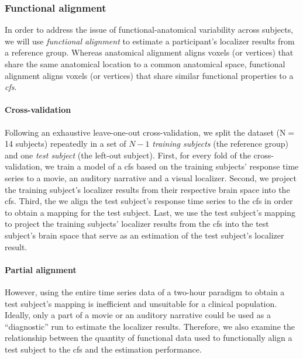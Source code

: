 \subsubsection{Functional alignment}


In order to address the issue of functional-anatomical variability across
subjects, we will use \textit{functional alignment} \citep[cf.][for
reviews]{haxby2020hyperalignment, bazeille2021empirical} to estimate a
participant's localizer results from a reference group.
%
Whereas anatomical alignment aligns voxels (or vertices) that share the same
anatomical location to a common anatomical space, functional alignment aligns
voxels (or vertices) that share similar functional properties to a
\textit{\ac{cfs}}.


\paragraph{Cross-validation}



%
Following an exhaustive leave-one-out cross-validation, we split the dataset
(N$=$14 subjects) repeatedly in a set of $N-1$ \textit{training subjects} (the
reference group) and one \textit{test subject} (the left-out subject).
%
First, for every fold of the cross-validation, we train a model of a \ac{cfs}
based on the training subjects' response time series to a movie, an auditory
narrative and a visual localizer.
%
Second, we project the training subject's localizer results from their
respective brain space into the \ac{cfs}.
%
Third, the we align the test subject's response time series to the \ac{cfs} in
order to obtain a mapping for the test subject.
%
Last, we use the test subject's mapping to project the training subjects'
localizer results from the \ac{cfs} into the test subject's brain space that
serve as an estimation of the test subject's localizer result.

\paragraph{Partial alignment}
However, using the entire time series data of a two-hour paradigm to obtain
a test subject's mapping is inefficient and unsuitable for a clinical
population.
%
Ideally, only a part of a movie or an auditory narrative could be used as a
``diagnostic'' run to estimate the localizer results.
%
Therefore, we also examine the relationship between the quantity of functional
data used to functionally align a test subject to the \ac{cfs} and the
estimation performance.



